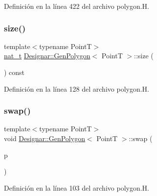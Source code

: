 Definición en la línea 422 del archivo polygon.\+H.

\mbox{\label{class_designar_1_1_gen_polygon_a7e39723b98f9fd7dabe41de58cf29575}} 
\subsubsection{\texorpdfstring{size()}{size()}}
{\footnotesize\ttfamily template$<$typename PointT$>$ \\
\hyperlink{namespace_designar_aa72662848b9f4815e7bf31a7cf3e33d1}{nat\+\_\+t} \hyperlink{class_designar_1_1_gen_polygon}{Designar\+::\+Gen\+Polygon}$<$ PointT $>$\+::size (\begin{DoxyParamCaption}{ }\end{DoxyParamCaption}) const\hspace{0.3cm}{\ttfamily [inline]}}



Definición en la línea 128 del archivo polygon.\+H.

\mbox{\label{class_designar_1_1_gen_polygon_ac3c88479623a86d9f49c24676f837c0d}} 
\subsubsection{\texorpdfstring{swap()}{swap()}}
{\footnotesize\ttfamily template$<$typename PointT$>$ \\
void \hyperlink{class_designar_1_1_gen_polygon}{Designar\+::\+Gen\+Polygon}$<$ PointT $>$\+::swap (\begin{DoxyParamCaption}\item[{\hyperlink{class_designar_1_1_gen_polygon}{Gen\+Polygon}$<$ PointT $>$ \&}]{p }\end{DoxyParamCaption})\hspace{0.3cm}{\ttfamily [inline]}}



Definición en la línea 103 del archivo polygon.\+H.

\mbox{\label{class_designar_1_1_gen_polygon_a46604941ab9b33349086f7ca4b222869}} 
